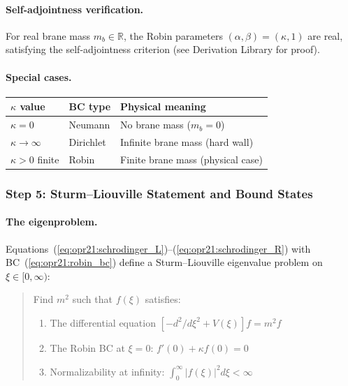 \paragraph{Self-adjointness verification.}
For real brane mass $m_b \in \mathbb{R}$, the Robin parameters $(\alpha, \beta) = (\kappa, 1)$
are real, satisfying the self-adjointness criterion (see Derivation Library for proof).

\paragraph{Special cases.}
\begin{center}
\begin{tabular}{lll}
\toprule
\textbf{$\kappa$ value} & \textbf{BC type} & \textbf{Physical meaning} \\
\midrule
$\kappa = 0$ & Neumann & No brane mass ($m_b = 0$) \\
$\kappa \to \infty$ & Dirichlet & Infinite brane mass (hard wall) \\
$\kappa > 0$ finite & Robin & Finite brane mass (physical case) \\
\bottomrule
\end{tabular}
\end{center}

\subsubsection{Step 5: Sturm--Liouville Statement and Bound States}
\label{subsubsec:opr21_step5}

\paragraph{The eigenproblem.}
Equations~(\ref{eq:opr21:schrodinger_L})--(\ref{eq:opr21:schrodinger_R})
with BC~(\ref{eq:opr21:robin_bc}) define a Sturm--Liouville eigenvalue problem
on $\xi \in [0, \infty)$:
\begin{quote}
Find $m^2$ such that $f(\xi)$ satisfies:
\begin{enumerate}[nosep]
    \item The differential equation $[-d^2/d\xi^2 + V(\xi)]f = m^2 f$
    \item The Robin BC at $\xi = 0$: $f'(0) + \kappa f(0) = 0$
    \item Normalizability at infinity: $\int_0^\infty |f(\xi)|^2 d\xi < \infty$
\end{enumerate}
\end{quote}

